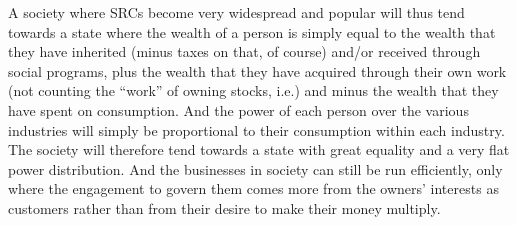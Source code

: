 \documentclass{article}
\begin{document}
A society where SRCs become very widespread and popular will thus tend towards a state where the wealth of a person is simply equal to the wealth that they have inherited (minus taxes on that, of course) and/or received through social programs, plus the wealth that they have acquired through their own work (not counting the ``work'' of owning stocks, i.e.) and minus the wealth that they have spent on consumption. And the power of each person over the various industries will simply be proportional to their consumption within each industry. The society will therefore tend towards a state with great equality and a very flat power distribution. And the businesses in society can still be run efficiently, only where the engagement to govern them comes more from the owners' interests as customers rather than from their desire to make their money multiply. 
\end{document}
